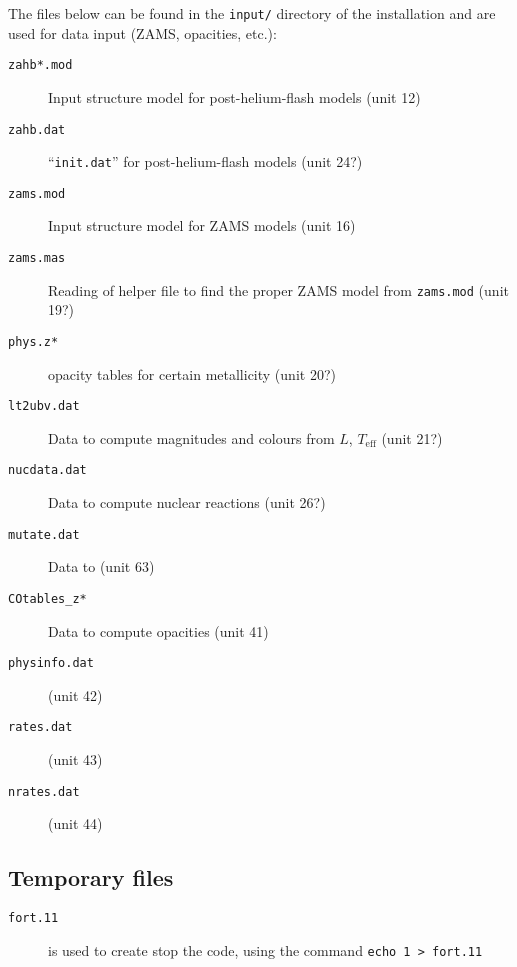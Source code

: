 The files below can be found in the \texttt{input/} directory of the installation and are used for data input (ZAMS, opacities, etc.):
\begin{description}
\item[\texttt{zahb*.mod}] Input structure model for post-helium-flash models (unit 12)
\item[\texttt{zahb.dat}] ``\texttt{init.dat}'' for post-helium-flash models (unit 24?)
\item[\texttt{zams.mod}] Input structure model for ZAMS models (unit 16)
\item[\texttt{zams.mas}] Reading of helper file to find the proper ZAMS model from \texttt{zams.mod} (unit 19?)
\item[\texttt{phys.z*}] opacity tables for certain metallicity  (unit 20?)
\item[\texttt{lt2ubv.dat}] Data to compute magnitudes and colours from $L$, $T_\mathrm{eff}$ (unit 21?)
\item[\texttt{nucdata.dat}] Data to compute nuclear reactions (unit 26?)
\item[\texttt{mutate.dat}] Data to  (unit 63)
\item[\texttt{COtables\_z*}] Data to compute opacities (unit 41)
\item[\texttt{physinfo.dat}]  (unit 42)
\item[\texttt{rates.dat}]  (unit 43)
\item[\texttt{nrates.dat}]  (unit 44)
\end{description}

\subsection{Temporary files}
\begin{description}
\item[\texttt{fort.11}] is used to create stop the code, using the command \texttt{echo 1 > fort.11}
\end{description}




